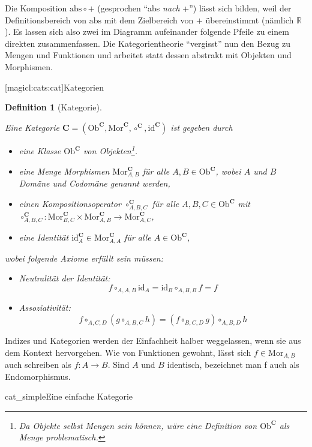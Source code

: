 \documentclass[a4paper, bibgerm]{book}
\newcommand\lsubsection{}
\newcommand\fig{}
\newcommand\ato{\rightarrow} %
\newtheorem{defini}{Definition}
\newcommand{\defi}[2]{%
  \begin{defini}[#1]
    \label{def:#1}
    #2
  \end{defini}
}
\begin{document}
Die Komposition $\mathrm{abs} \circ +$ (gesprochen "`abs \textit{nach} +"') lässt
sich bilden, weil der Definitionsbereich von $\mathrm{abs}$ mit dem
Zielbereich von $+$ übereinstimmt (nämlich $\mathbb{R}$). Es lassen sich
also zwei im Diagramm aufeinander folgende Pfeile zu einem direkten
zusammenfassen. Die Kategorientheorie "`vergisst"' nun den Bezug zu
Mengen und Funktionen und arbeitet statt dessen abstrakt mit Objekten
und Morphismen.

\lsubsection[magicl:cats:cat]{Kategorien}

\defi{Kategorie}{
Eine Kategorie $\mathbf{C} = (\mathrm{Ob}^\mathbf{C}, \mathrm{Mor}^\mathbf{C},
\circ^\mathbf{C}, \mathrm{id}^\mathbf{C})$ ist gegeben durch
\begin{itemize}
\item eine Klasse $\mathrm{Ob}^\mathbf{C}$ von Objekten\footnote{Da Objekte selbst Mengen
    sein können, wäre eine Definition von $\mathrm{Ob}^\mathbf{C}$ als Menge problematisch.}.
\item eine Menge Morphismen $\mathrm{Mor}^\mathbf{C}_{A,B}$ für alle $ A,B \in
  \mathrm{Ob}^\mathbf{C}$, wobei $A$ und $B$ Domäne und Codomäne genannt werden,
\item einen Kompositionsoperator $\circ^\mathbf{C}_{A,B,C}$ für alle $
  A,B,C \in \mathrm{Ob}^\mathbf{C}$ mit \\
  $\circ^\mathbf{C}_{A,B,C} : \mathrm{Mor}^\mathbf{C}_{B,C} \times
  \mathrm{Mor}^\mathbf{C}_{A,B} \rightarrow \mathrm{Mor}^\mathbf{C}_{A,C}$,
\item eine Identität $\mathrm{id}^\mathbf{C}_A \in \mathrm{Mor}^\mathbf{C}_{A,A}$ für alle $ A \in \mathrm{Ob}^\mathbf{C}$,
\end{itemize}
wobei folgende Axiome erfüllt sein müssen:
\begin{itemize}
\item Neutralität der Identität: $$f \circ_{A,A,B} \mathrm{id}_A = \mathrm{id}_B \circ_{A,B,B} f = f$$
\item Assoziativität:
  $$f \circ_{A,C,D} (g \circ_{A,B,C} h) = (f \circ_{B,C,D} g) \circ_{A,B,D}h$$
\end{itemize}
}

Indizes und Kategorien werden der Einfachheit halber weggelassen, wenn
sie aus dem Kontext hervorgehen. Wie von Funktionen gewohnt, lässt sich
$f \in \mathrm{Mor}_{A,B}$ auch schreiben als $f : A \ato B$. Sind $A$
und $B$ identisch, bezeichnet man f auch als Endomorphismus.

\fig{cat_simple}{Eine einfache Kategorie}
\end{document}
